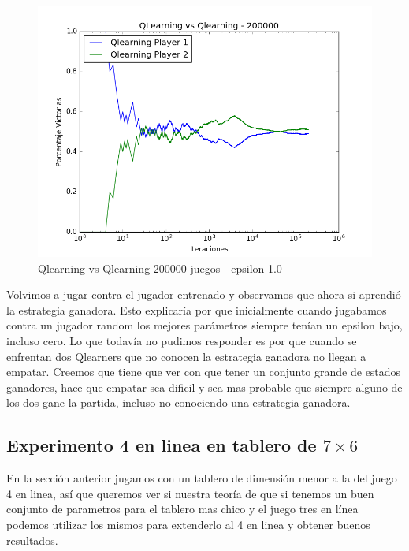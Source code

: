 \begin{figure}[h]
 \centering
 \begin{minipage}{.45\textwidth}
	\centering
	\includegraphics[scale=0.35]{img1/QlearningVsQlearning_200000_6x5_merge_e0p1.png}
        \caption{Qlearning vs Qlearning 200000 juegos - epsilon 1.0}
  \end{minipage}
\end{figure}


Volvimos a jugar contra el jugador entrenado y observamos que ahora si aprendió la estrategia ganadora. Esto explicaría por que inicialmente cuando jugabamos contra un jugador random los mejores parámetros siempre tenían un epsilon bajo, incluso cero.
Lo que todavía no pudimos responder es por que cuando se enfrentan dos Qlearners que no conocen la estrategia ganadora no llegan a empatar. Creemos que tiene que ver con que tener un conjunto grande de estados ganadores, hace que empatar sea dificil y sea mas probable que siempre alguno de los dos gane la partida, incluso no conociendo una estrategia ganadora.\\



\subsection{Experimento 4 en linea en tablero de $7\times6$}
En la sección anterior jugamos con un tablero de dimensión menor a la del juego 4 en linea, así que queremos ver si nuestra teoría de que si tenemos un buen conjunto de parametros para el tablero mas chico y el juego tres en línea podemos utilizar los mismos para extenderlo al 4 en linea y obtener buenos resultados.

